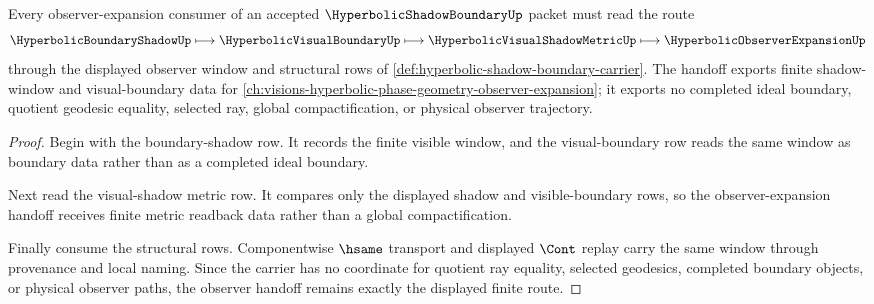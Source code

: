 \begin{theorem}
\label{thm:hyperbolic-shadow-boundary-observer-handoff}
Every observer-expansion consumer of an accepted $\HyperbolicShadowBoundaryUp$ packet must read the route
$$
\HyperbolicBoundaryShadowUp \longmapsto \HyperbolicVisualBoundaryUp \longmapsto \HyperbolicVisualShadowMetricUp \longmapsto \HyperbolicObserverExpansionUp
$$
through the displayed observer window and structural rows of \autoref{def:hyperbolic-shadow-boundary-carrier}. The handoff exports finite shadow-window and visual-boundary data for \autoref{ch:visions-hyperbolic-phase-geometry-observer-expansion}; it exports no completed ideal boundary, quotient geodesic equality, selected ray, global compactification, or physical observer trajectory.
\end{theorem}
\begin{proof}
Begin with the boundary-shadow row. It records the finite visible window, and the visual-boundary row reads the same window as boundary data rather than as a completed ideal boundary.

Next read the visual-shadow metric row. It compares only the displayed shadow and visible-boundary rows, so the observer-expansion handoff receives finite metric readback data rather than a global compactification.

Finally consume the structural rows. Componentwise $\hsame$ transport and displayed $\Cont$ replay carry the same window through provenance and local naming. Since the carrier has no coordinate for quotient ray equality, selected geodesics, completed boundary objects, or physical observer paths, the observer handoff remains exactly the displayed finite route.
\end{proof}


\begin{closurestatus}{\HyperbolicShadowBoundaryUp}
  \theoryclosure{\seedClosure}
  \formalstatus{\unformalizedV}
\end{closurestatus}
